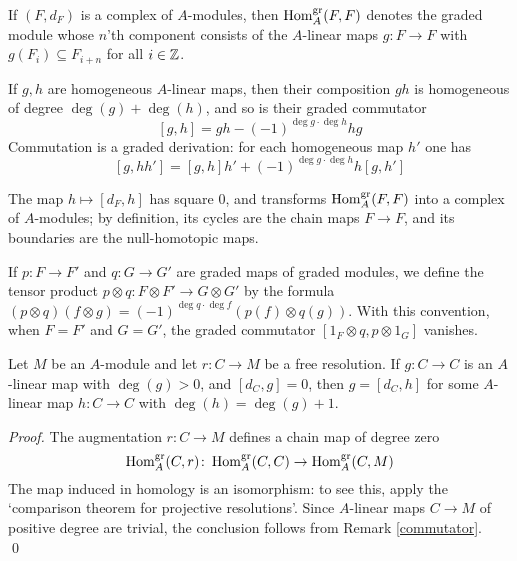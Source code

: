\begin{Remark}
\label{commutator}
If $(F,d_F)$ is a complex of $A$-modules, then $\operatorname{Hom}^{{\operatorname{gr}}}_A(F,F)$
denotes the graded module whose $n$'th component consists of the
$A$-linear maps $g\colon F\to F$ with $g(F_i)\subseteq F_{i+n}$ for all
$i\in{\mathbb Z}$.

If $g,h$ are homogeneous
$A$-linear maps, then their composition $gh$ is homogeneous of degree
$\deg(g)+\deg(h)$, and so is their graded commutator
\[
[g,h] = g h - (-1)^{\deg g\cdot \deg h} h g
\]
Commutation is a graded derivation: for each homogeneous map $h'$ one has
\[
[g,hh']= [g,h]h'+(-1)^{\deg g\cdot \deg h}h[g,h']
\]

The map $h\mapsto [d_F,h]$ has square $0$, and transforms
$\operatorname{Hom}^{{\operatorname{gr}}}_A(F,F)$ into a complex of $A$-modules; by definition, its
cycles are the chain maps $F\to F$, and its boundaries are the
null-homotopic maps.
 \end{Remark}

\begin{Remark}\label{graded-map-tensor}
If $p\colon F \to F'$ and $q\colon G \to G'$ are graded maps of graded
modules, we define the tensor product $p \otimes q\colon F \otimes F'
\to G \otimes G'$ by the formula $(p \otimes q)(f \otimes g)=(-1)^{\deg
q \cdot\deg f}( p(f) \otimes q(g) )$.  With this convention, when $F=F'$
and $G=G'$, the graded commutator $[1_F \otimes q,p \otimes 1_G]$
vanishes.
 \end{Remark}

\begin{lemma}
\label{quism}
Let $M$ be an $A$-module and let $r\colon C\to M$ be a free resolution.
If $g\colon C\to C$ is an $A$-linear map with $\deg(g)>0$, and
$[d_C,g]=0$, then $g=[d_C,h]$ for some $A$-linear map $h\colon C\to C$
with $\deg(h)=\deg(g)+1$.
 \end{lemma}

\begin{proof}
The augmentation $r\colon C \to M$ defines a chain map of degree zero
\[
\operatorname{Hom}^{\operatorname{gr}}_A(C,r)\colon \operatorname{Hom}^{\operatorname{gr}}_A(C,C)\to\operatorname{Hom}^{\operatorname{gr}}_A(C,M)
\]
The map induced in homology is an isomorphism: to see this, apply the
`comparison theorem for projective resolutions'.  Since $A$-linear maps
$C\to M$ of positive degree are trivial, the conclusion follows from
Remark \ref{commutator}. \qed
 \end{proof}

